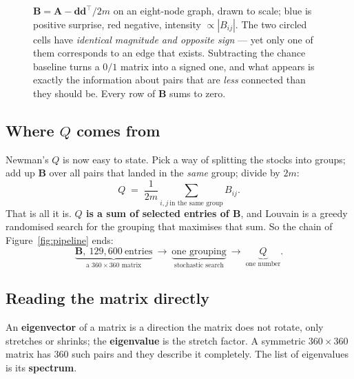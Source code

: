 \documentclass[11pt,a4paper]{article}
\newcommand{\Q}{Q}
\newcommand{\Amat}{\mathbf{A}}
\newcommand{\Bmat}{\mathbf{B}}
\newcommand{\dvec}{\mathbf{d}}
\begin{document}
\begin{figure}[t]
\caption{$\Bmat=\Amat-\dvec\dvec^{\!\top}\!/2m$ on an eight-node graph, drawn to
scale; blue is positive surprise, red negative, intensity $\propto|B_{ij}|$. The
two circled cells have \emph{identical magnitude and opposite sign} --- yet only
one of them corresponds to an edge that exists. Subtracting the chance baseline
turns a $0/1$ matrix into a signed one, and what appears is exactly the
information about pairs that are \emph{less} connected than they should be.
Every row of $\Bmat$ sums to zero.}
\label{fig:bmatrix}
\end{figure}

\subsection{Where \texorpdfstring{$\Q$}{Q} comes from}

Newman's $\Q$ is now easy to state. Pick a way of splitting the stocks into
groups; add up $\Bmat$ over all pairs that landed in the \emph{same} group;
divide by $2m$:
\[
  \Q \;=\; \frac{1}{2m}\sum_{i,j\ \text{in the same group}} B_{ij}.
\]
That is all it is. \textbf{$\Q$ is a sum of selected entries of $\Bmat$}, and
Louvain is a greedy randomised search for the grouping that maximises that sum.
So the chain of Figure~\ref{fig:pipeline} ends:
\[
  \underbrace{\Bmat,\ 129{,}600\ \text{entries}}_{\text{a }360\times360\text{ matrix}}
  \ \longrightarrow\
  \underbrace{\text{one grouping}}_{\text{stochastic search}}
  \ \longrightarrow\
  \underbrace{\Q}_{\text{one number}} .
\]

\subsection{Reading the matrix directly}

An \textbf{eigenvector} of a matrix is a direction the matrix does not rotate,
only stretches or shrinks; the \textbf{eigenvalue} is the stretch factor. A
symmetric $360\times360$ matrix has $360$ such pairs and they describe it
completely. The list of eigenvalues is its \textbf{spectrum}.
\end{document}
